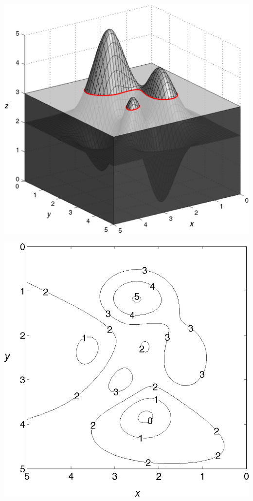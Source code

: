 \begin{minipage}[t]{0.48\columnwidth}
    \includegraphics[width=\columnwidth]{images/niveaulinien1.png}
\end{minipage}
\hfill
\begin{minipage}[t]{0.48\columnwidth}
    \includegraphics[width=\columnwidth]{images/niveaulinien2.png}
\end{minipage}